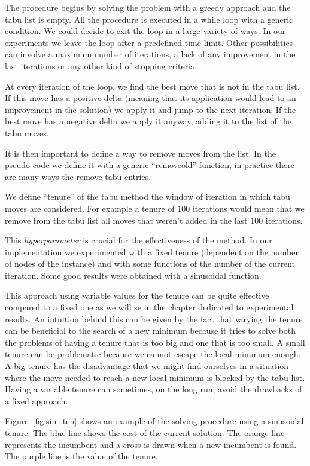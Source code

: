 \documentclass{article}
\begin{document}
The procedure begins by solving the problem with a greedy approach and the tabu list
is empty. All the procedure is executed in a while loop with a generic condition. We could
decide to exit the loop in a large variety of ways. In our experiments we leave the loop
after a predefined time-limit. Other possibilities can involve a maximum number of iterations, a lack of any improvement in the last iterations or any other kind of stopping criteria.

At every iteration of the loop, we find the best move that is not in the tabu list. If this move has a positive delta (meaning that its application would lead to an
improvement in the solution) we apply it and jump to the next iteration. If the best
move has a negative delta we apply it anyway, adding it to the list of the tabu moves.

It is then important to define a way to remove moves from the list. In the pseudo-code we define it with a generic ``removeold'' function, in practice there are many ways the remove tabu entries.

We define ``tenure'' of the tabu method the window of iteration in which tabu moves are considered. For example a tenure of $100$ iterations would mean that we remove
from the tabu list all moves that weren't added in the last $100$ iterations.

This \textit{hyperparameter} is crucial for the effectiveness of the method. In our implementation we experimented with a fixed tenure (dependent on the number of
nodes of the instance) and with some functions of the number of the current iteration. Some good results were obtained with a sinusoidal function.

This approach using variable values for the tenure can be quite effective compared to a fixed one as we will se in the chapter dedicated to experimental results.
An intuition behind this can be given by the fact that varying the tenure can be beneficial to the search of a new minimum because it tries to solve both the problems of having a tenure that is too big and one that is too small.
A small tenure can be problematic because we cannot escape the local minimum enough. A big tenure has the disadvantage that we might find ourselves in a situation where the move needed to reach a new local minimum is blocked by the
tabu list. Having a variable tenure can sometimes, on the long run, avoid the drawbacks of a fixed approach.

Figure~\ref{fig:sin_ten} shows an example of the solving procedure using
a sinusoidal tenure.
The blue line shows the cost of the current solution. The orange line represents
the incumbent and a cross is drawn when a new incumbent is found.
The purple line is the value of the tenure.
\end{document}

